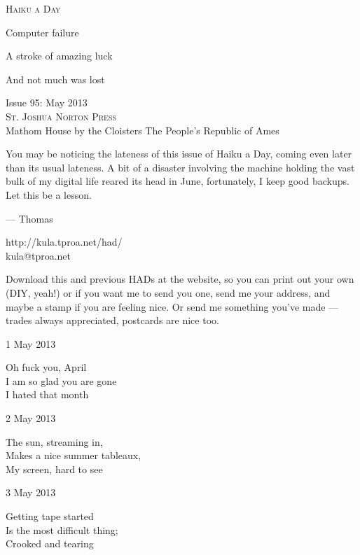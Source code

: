 \documentclass[12pt]{article}
\begin{document}
\begin{center}
{\fontsize{36}{48}\selectfont \textsc{Haiku a Day }}
\end{center}

\vspace*{3.5cm}

{\fontsize{20}{40}\selectfont 

Computer failure

A stroke of amazing luck

And not much was lost

}

\vspace*{5.0cm}
\begin{center}
{\large{Issue 95: May 2013}} \\[5mm]
{\fontsize{8}{8}\selectfont  \textsc{ St. Joshua Norton Press }} \\[1mm]
{\fontsize{6}{6}\selectfont Mathom House by the Cloisters \textbar The People's Republic of Ames }
\end{center}


\newpage

You may be noticing the lateness of this issue of Haiku a Day, coming even
later than its usual lateness. A bit of a disaster involving the 
machine holding the vast bulk of my digital life reared its head in June, fortunately,
I keep good backups. Let this be a lesson. 

--- Thomas

http://kula.tproa.net/had/ \\
kula@tproa.net

Download this and previous HADs at the website, so you can
print out your own (DIY, yeah!) or if you want me to send
you one, send me your address, and maybe a stamp if you
are feeling nice. Or send me something you've made ---
trades always appreciated, postcards are nice too.

\vfill

1 May 2013

Oh fuck you, April \\
I am so glad you are gone \\
I hated that month

2 May 2013

The sun, streaming in, \\
Makes a nice summer tableaux, \\
My screen, hard to see

3 May 2013

Getting tape started \\
Is the most difficult thing; \\
Crooked and tearing
\end{document}
